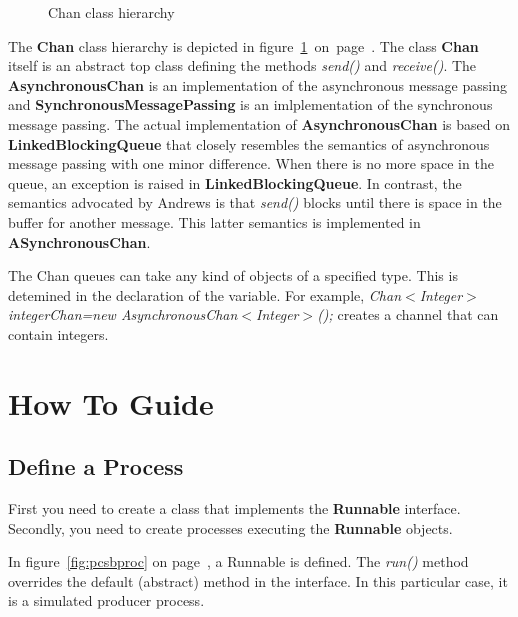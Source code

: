 \documentclass[11pt]{article} %
\begin{document}
\begin{figure}[ht]
\caption{Chan class hierarchy}
\label{fig:chanHierarchy}

\end{figure}

The {\bfseries Chan} class hierarchy is depicted in figure~\ref{fig:chanHierarchy}~on~page~\pageref{fig:chanHierarchy}. The class {\bfseries Chan} itself is an abstract top class defining the methods \emph{send()} and \emph{receive()}. The {\bfseries AsynchronousChan} is an implementation of the asynchronous message passing and {\bfseries  SynchronousMessagePassing} is an imlplementation of the synchronous message passing. The actual implementation of {\bfseries AsynchronousChan} is based on {\bfseries LinkedBlockingQueue} that closely resembles the semantics of asynchronous message passing with one minor difference. When there is no more space in the queue, an exception is raised in {\bfseries LinkedBlockingQueue}. In contrast, the semantics advocated by Andrews is that \emph{send()} blocks until there is space in the buffer for another message. This latter semantics is implemented in {\bfseries ASynchronousChan}. 

The Chan queues can take any kind of objects of a specified type. This is detemined in the declaration of the variable. For example, \emph{Chan$<$Integer$>$ integerChan=new AsynchronousChan$<$Integer$>$();} creates a channel that can contain integers.

\section{How To Guide}

\subsection{Define a Process}
First you need to create a class that implements the {\bfseries Runnable} interface. Secondly, you need to create processes executing the {\bfseries Runnable} objects.

In figure~\ref{fig:pcsbproc} on page~\pageref{fig:pcsbproc}, a Runnable is defined. The \emph{run()} method overrides the default (abstract) method in the interface. In this particular case, it is a simulated producer process.
\end{document}
